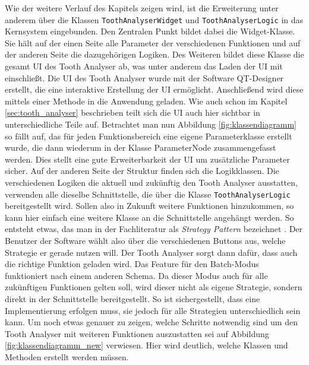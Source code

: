 Wie der weitere Verlauf des Kapitels zeigen wird, ist die Erweiterung unter
anderem über die Klassen \texttt{ToothAnalyserWidget} und \texttt{ToothAnalyserLogic}
in das Kernsystem eingebunden. Den Zentralen Punkt bildet dabei die Widget-Klasse.
Sie hält auf der einen Seite alle Parameter der verschiedenen Funktionen und auf
der anderen Seite die dazugehörigen Logiken. Des Weiteren bildet diese Klasse die
gesamt \ac{UI} des Tooth Analyser ab, was unter anderem das Laden der \ac{UI}
mit einschließt. Die \ac{UI} des Tooth Analyser wurde mit der Software QT-Designer
erstellt, die eine interaktive Erstellung der \ac{UI} ermöglicht. Anschließend wird
diese mittels einer Methode in die Anwendung geladen. Wie auch schon im Kapitel
\ref{sec:tooth_analyser} beschrieben teilt sich die \ac{UI} auch hier sichtbar in
unterschiedliche Teile auf. Betrachtet man nun Abbildung
\ref{fig:klassendiagramm} so fällt auf, das für jeden Funktionsbereich eine eigene
Parameterklasse erstellt wurde, die dann wiederum in der Klasse ParameterNode
zusammengefasst werden. Dies stellt eine gute Erweiterbarkeit der \ac{UI} um
zusätzliche Parameter sicher. Auf der anderen Seite der Struktur finden sich die
Logikklassen. Die verschiedenen Logiken die aktuell und zukünftig den Tooth
Analyser ausstatten, verwenden alle dieselbe Schnittstelle, die über die Klasse
\texttt{ToothAnalyserLogic} bereitgestellt wird. Sollen also in Zukunft weitere
Funktionen hinzukommen, so kann hier einfach eine weitere Klasse an die Schnittstelle
angehängt werden. So entsteht etwas, das man in der Fachliteratur als \textit{Strategy
Pattern} bezeichnet \citep[vgl.][S.~99]{siebler2014}. Der Benutzer der Software
wählt also über die verschiedenen Buttons aus, welche Strategie er gerade nutzen
will. Der Tooth Analyser sorgt dann dafür, dass auch die richtige Funktion geladen
wird. Das Feature für den Batch-Modus funktioniert nach einem anderen Schema. Da
dieser Modus auch für alle zukünftigen Funktionen gelten soll, wird dieser nicht
als eigene Strategie, sondern direkt in der Schnittstelle bereitgestellt. So ist
sichergestellt, dass eine Implementierung erfolgen muss, sie jedoch für alle
Strategien unterschiedlich sein kann. Um noch etwas genauer zu zeigen, welche
Schritte notwendig sind um den Tooth Analyser mit weiteren Funktionen
auszustatten sei auf Abbildung \ref{fig:klassendiagramm_new} verwiesen. Hier wird
deutlich, welche Klassen und Methoden erstellt werden müssen.

